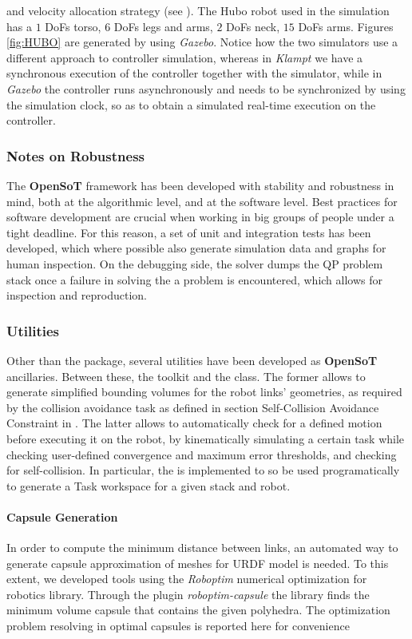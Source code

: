 and velocity allocation strategy (see ).
The Hubo robot used in the simulation has a $1$ DoFs torso, $6$ DoFs legs and arms, $2$ DoFs neck, $15$ DoFs arms. Figures \ref{fig:HUBO} are generated by using \emph{Gazebo}. Notice how the two simulators use a different approach to controller simulation, whereas in \emph{Klampt} we have a synchronous execution of the controller together with the simulator, while in \emph{Gazebo} the controller runs asynchronously and needs to be synchronized by using the simulation clock, so as to obtain a simulated real-time execution on the controller.

\subsubsection{Notes on Robustness}
The \textbf{OpenSoT} framework has been developed with stability and robustness in mind, both at the algorithmic level, and at the software level. Best practices for software development are crucial when working in big groups of people under a tight deadline. For this reason, a set of unit and integration tests has been developed, which where possible also generate simulation data and graphs for human inspection. On the debugging side, the solver dumps the QP problem stack once a failure in solving the a problem is encountered, which allows for inspection and reproduction.

\subsubsection{Utilities}
Other than the  package, several utilities have been developed as \textbf{OpenSoT} ancillaries. Between these, the  toolkit and the  class. The former allows to generate simplified bounding volumes for the robot links' geometries, as required by the collision avoidance task as defined in section Self-Collision Avoidance Constraint in \cite{rocchimingo:16}. %
The latter allows to automatically check for a defined motion before executing it on the robot, by kinematically simulating a certain task while checking user-defined convergence and maximum error thresholds, and checking for self-collision. In particular, the  is implemented to so be used programatically to generate a Task workspace for a given stack and robot.

\paragraph{Capsule Generation}
\label{subsub:CapsuleGeneration}
In order to compute the minimum distance between links, an automated way to generate capsule approximation of meshes for URDF model is needed. To this extent, we developed tools using the \emph{Roboptim} \cite{Moulard2013-nk,Moulard_undated-tm} numerical optimization for robotics library. Through the plugin \emph{roboptim-capsule} the library finds the minimum volume capsule that contains the given polyhedra. The optimization problem resolving in optimal capsules is reported here for convenience \cite{el_khoury2013-rp}

